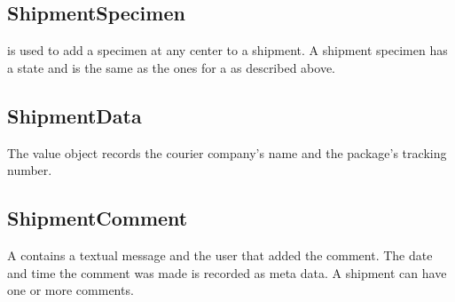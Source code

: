 \subsection*{ShipmentSpecimen}
 is used to add a specimen at any center to a
shipment.  A shipment specimen has a state and is the same as the ones for a
 as described above.

\subsection*{ShipmentData}
The  value object records the courier company's name
and the package's tracking number.

\subsection*{ShipmentComment}
A  contains a textual message and the user that
added the comment. The date and time the comment was made is recorded as meta
data. A shipment can have one or more comments.

